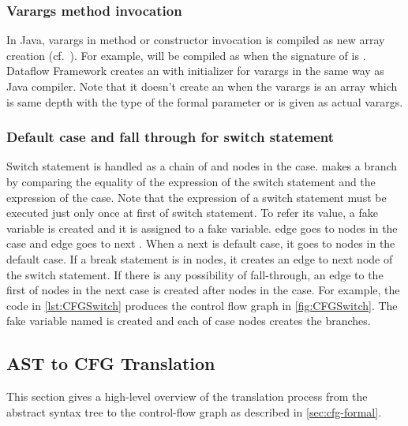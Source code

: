 \subsubsection{Varargs method invocation}
\label{sec:varargs}
In Java, varargs in method or constructor invocation is compiled
as new array creation (cf.\ ). For example,
 will be compiled as 
when the signature of  is . Dataflow
Framework creates an  with initializer for varargs
in the same way as Java compiler. Note that it doesn't create an 
when the varargs is an array which is same depth with the type of
the formal parameter or  is given as actual varargs.

\subsubsection{Default case and fall through for switch statement}
\label{sec:default-switch}
Switch statement is handled as a chain of  and nodes in
the case.  makes a branch by comparing the equality of
the expression of the switch statement and the expression of the case.
Note that the expression of a switch statement must be executed just only
once at first of switch statement. To refer its value, a fake variable
is created and it is assigned to a fake variable. 
edge goes to nodes in the case and  edge goes to next
. When a next is default case, it goes to nodes in the default
case. If a break statement is in nodes, it creates an edge to next node of
the switch statement. If there is any possibility of fall-through, an edge
to the first of nodes in the next case is created after nodes in the case.
For example, the code in \autoref{lst:CFGSwitch} produces the control flow
graph in \autoref{fig:CFGSwitch}. The fake variable named 
is created and each of case nodes creates the branches.


\subsection{AST to CFG Translation}
\label{sec:ast_to_cfg_translation}

This section gives a high-level overview of the translation process
from the abstract syntax tree to the control-flow graph as described
in \autoref{sec:cfg-formal}.

